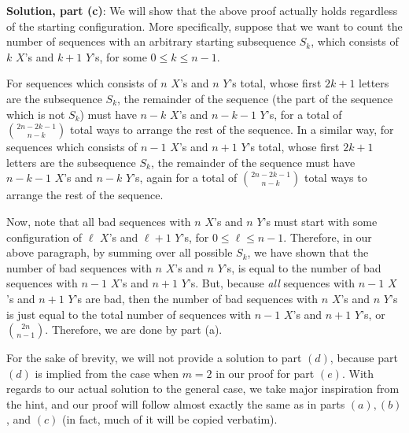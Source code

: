 \documentclass{article}
\newcommand{\V}{

\vspace{\baselineskip}

}
\begin{document}
\begin{solution}
\textbf{Solution, part (c)}: We will show that the above proof actually holds regardless of the starting configuration. More specifically, suppose that we want to count the number of sequences with an arbitrary starting subsequence $S_k$, which consists of $k$ $X$'s and $k+1$ $Y$'s, for some $0\leq k\leq n-1$. \V
    
For sequences which consists of $n$ $X$'s and $n$ $Y$'s total, whose first $2k+1$ letters are the subsequence $S_k$, the remainder of the sequence (the part of the sequence which is not $S_k$) must have $n-k$ $X$'s and $n-k-1$ $Y$'s, for a total of $\binom{2n-2k-1}{n-k}$ total ways to arrange the rest of the sequence. In a similar way, for sequences which consists of $n-1$ $X$'s and $n+1$ $Y$'s total, whose first $2k+1$ letters are the subsequence $S_k$, the remainder of the sequence must have $n-k-1$ $X$'s and $n-k$ $Y$'s, again for a total of $\binom{2n-2k-1}{n-k}$ total ways to arrange the rest of the sequence.\V
    
Now, note that all bad sequences with $n$ $X$'s and $n$ $Y$'s must start with some configuration of $\ell$ $X$'s and $\ell+1$ $Y$'s, for $0\leq \ell\leq n-1$. Therefore, in our above paragraph, by summing over all possible $S_k$, we have shown that the number of bad sequences with $n$ $X$'s and $n$ $Y$'s, is equal to the number of bad sequences with $n-1$ $X$'s and $n+1$ $Y$'s. But, because \textit{all} sequences with $n-1$ $X$'s and $n+1$ $Y$'s are bad, then the number of bad sequences with $n$ $X$'s and $n$ $Y$'s is just equal to the total number of sequences with $n-1$ $X$'s and $n+1$ $Y$'s, or $\binom{2n}{n-1}$. Therefore, we are done by part (a).
\end{solution}\V

For the sake of brevity, we will not provide a solution to part $(d)$, because part $(d)$ is implied from the case when $m=2$ in our proof for part $(e)$. With regards to our actual solution to the general case, we take major inspiration from the hint, and our proof will follow almost exactly the same as in parts $(a), (b)$, and $(c)$ (in fact, much of it will be copied verbatim). \V
\end{document}
